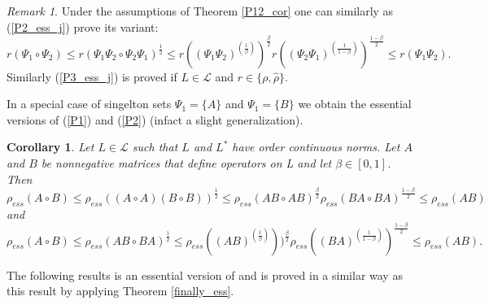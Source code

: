 \documentclass[12pt, reqno]{amsart}
\newtheorem{corollary}[theorem]{Corollary}
\theoremstyle{definition}
\theoremstyle{remark}
\newtheorem{remark}[theorem]{Remark}
\numberwithin{equation}{section}
\newcommand{\be}{\begin{equation}}
\newcommand{\ee}{\end{equation}}
\begin{document}
\begin{remark} {\rm Under the assumptions of Theorem \ref{P12_cor} one can similarly as (\ref{P2_ess_j}) prove its variant:
\be
r (\Psi_1 \circ \Psi_2) \le r (\Psi_1\Psi_2\circ \Psi_2\Psi_1)^{\frac{1}{2}} \le r((\Psi_1\Psi_2)^{(\frac{1}{\beta})})^{\frac{\beta}{2}}r((\Psi_2\Psi_1)^{(\frac{1}{1-\beta})})^{\frac{1-\beta}{2}} 
\le  r (\Psi_1\Psi_2).
\label{P3_ess_j}
\ee
Similarly (\ref{P3_ess_j}) is proved if  $L\in \mathcal{L}$ and $r\in \{ \rho, \hat{\rho}\}$.
}
\end{remark}
In a special case of singelton sets $\Psi _1=\{A\}$ and $\Psi _1=\{B\}$ we obtain the essential versions of (\ref{P1}) and (\ref{P2}) (infact a slight generalization). 
\begin{corollary}Let $L\in \mathcal{L}$ such that %
$L$ and $L^*$ have order continuous norms. 
Let $A$ and $B$ be nonnegative matrices that define operators on L and let $\beta \in [0,1]$. Then  
\be
\rho _{ess} (A\circ B) \le \rho_{ess} ((A\circ A)(B\circ B))^{\frac{1}{2}}\le \rho_{ess}(AB \circ AB)^{\frac{\beta}{2}} \rho_{ess}(BA \circ BA)^{\frac{1-\beta}{2}} \le \rho_{ess} (AB)
\label{P1_ess}
\ee
and
\be
\rho_{ess} (A\circ B) \le \rho_{ess} (AB\circ BA)^{\frac{1}{2}}\le  \rho_{ess}((AB)^{(\frac{1}{\beta})}))^{\frac{\beta}{2}} \rho_{ess}((BA)^{(\frac{1}{1-\beta})})^{\frac{1-\beta}{2}}  \le  \rho_{ess} (AB).
\label{P2_ess}
\ee
\label{essential_Aud}
\end{corollary}

The following results is an essential version of \cite[Lemma 3.16]{B23+} and is proved in a similar way as this result by applying Theorem \ref{finally_ess}.
\end{document}
